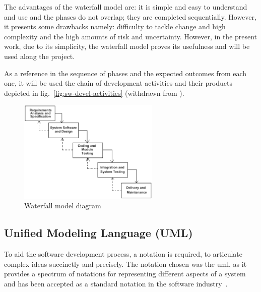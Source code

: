 The advantages of the waterfall model are: it is simple and easy to understand
and use and the phases do not overlap; they are completed sequentially. However,
it presents some drawbacks namely: difficulty to tackle change and high
complexity and the high amounts of risk and uncertainty. However, in the present
work, due to its simplicity, the waterfall model proves its usefulness and will
be used along the project.

As a reference in the sequence of phases and the expected outcomes from each
one, it will be used the chain of development activities and their products
depicted in fig.~\ref{fig:sw-devel-activities} (withdrawn from
\cite{bruegge2004object}).

\begin{figure}[!hbt]
\centering
    \includegraphics[width=0.6\textwidth]{./img/waterfall.png}
  \caption{Waterfall model diagram}\label{fig:waterfall}
\end{figure}

\subsection{Unified Modeling Language (UML)}
\label{subsec:uml}
To aid the software development process, a notation is required, to articulate
complex ideas succinctly and precisely. The notation chosen was the \gls{uml},
as it provides a spectrum of notations for representing different aspects of a
system and has been accepted as a standard notation in the software
industry~\cite{bruegge2004object}.

